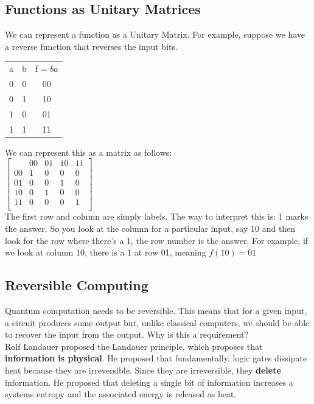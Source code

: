 \documentclass[11pt]{article} %
\begin{document}
\subsection{Functions as Unitary Matrices}{}
We can represent a function as a Unitary Matrix. For example, suppose we have a reverse function that reverses the input bits.

\begin{center}
\begin{tabular}{ |c|c|c| } 
 \hline
 a & b & f = $ba$ \\ 
 0 & 0 & 00 \\ 
 0 & 1 & 10 \\ 
 1 & 0 & 01 \\ 
 1 & 1 & 11 \\ 
 \hline
\end{tabular}
\end{center}

We can represent this as a matrix as follows:\\

$
\begin{bmatrix}
& 00 & 01 & 10 & 11\\
00 &1 & 0 & 0 & 0\\
01 & 0 & 0 & 1 & 0\\
10 & 0& 1 & 0 & 0\\
11& 0& 0 & 0 & 1\\
\end{bmatrix}
$\\

\noindent The first row and column are simply labels. The way to interpret this is: 1 marks the answer. So you look at the column for a particular input, say 10 and then look for the row where there's a 1, the row number is the answer. For example, if we look at column 10, there is a 1 at row 01, meaning $f(10) = 01$

\subsection{Reversible Computing}{}
\noindent Quantum computation needs to be reversible. This means that for a given input, a circuit produces some output but, unlike classical computers, we should be able to recover the input from the output. Why is this a requirement?\\

\noindent Rolf Landauer proposed the Landauer principle, which proposes that \textbf{information is physical}. He proposed that fundamentally, logic gates dissipate heat because they are irreversible. Since they are irreversible, they \textbf{delete} information. He proposed that deleting a single bit of information increases a systems entropy and the associated energy is released as heat.\\
\end{document}
